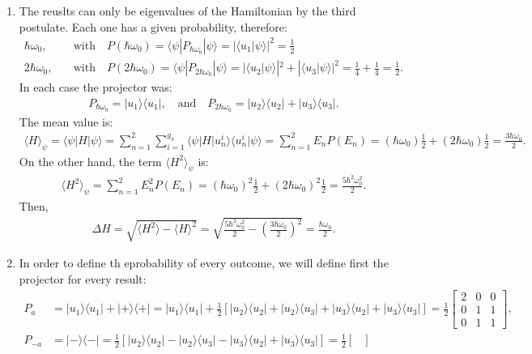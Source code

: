 \documentclass[letterpaper,11pt,twoside]{article}
\newcommand{\ket}[1]{|#1\rangle}
\newcommand{\bra}[1]{\langle#1|}
\newcommand{\braket}[1]{\langle#1\rangle}
\begin{document}
\begin{enumerate}[itemsep=0pt,topsep=0pt,label=\alph*.]
  \item The reuslts can only be eigenvalues of the Hamiltonian by the third postulate. Each one has a given probability, therefore:
  \begin{align*}
    \hbar\omega_0,&\quad\text{with}\quad P(\hbar\omega_0)=\braket{\psi|P_{\hbar\omega_0}|\psi}=|\braket{u_1|\psi}|^2=\frac{1}{2}\\
    2\hbar\omega_0,&\quad\text{with}\quad P(2\hbar\omega_0)=\braket{\psi|P_{2\hbar\omega_0}|\psi}=|\braket{u_2|\psi}|^2+|\braket{u_3|\psi}|^2=\frac{1}{4}+\frac{1}{4}=\frac{1}{2}.
  \end{align*}
  In each case the projector was:
  \begin{align*}
    P_{\hbar\omega_0}=\ket{u_1}\bra{u_1},\quad\text{and}\quad P_{2\hbar\omega_0}=\ket{u_2}\bra{u_2}+\ket{u_3}\bra{u_3}.
  \end{align*}
  The mean value is:
  \begin{align*}
    \braket{H}_\psi=\braket{\psi|H|\psi}=\sum_{n=1}^2\sum_{i=1}^{g_n}\braket{\psi|H|u_n^i}\braket{u_n^i|\psi}=\sum_{n=1}^2E_nP(E_n)=(\hbar\omega_0)\frac{1}{2}+(2\hbar\omega_0)\frac{1}{2}=\frac{3\hbar\omega_0}{2}.
  \end{align*}
  On the other hand, the term $\braket{H^2}_\psi$ is:
  \begin{align*}
    \braket{H^2}_\psi=\sum_{n=1}^2E_n^2P(E_n)=(\hbar\omega_0)^2\frac{1}{2}+(2\hbar\omega_0)^2\frac{1}{2}=\frac{5\hbar^2\omega_0^2}{2}.
  \end{align*}
  Then,
  \begin{align*}
    \Delta H=\sqrt{\braket{H^2}-\braket{H}^2}=\sqrt{\frac{5\hbar^2\omega_0^2}{2}-\left(\frac{3\hbar\omega_0}{2}\right)^2}=\frac{\hbar\omega_0}{2}.
  \end{align*}
  \item In order to define th eprobability of every outcome, we will define first the projector for every result:
  \begin{align*}
    P_a&=\ket{u_1}\bra{u_1}+\ket{+}\bra{+}=\ket{u_1}\bra{u_1}+\frac{1}{2}[\ket{u_2}\bra{u_2}+\ket{u_2}\bra{u_3}+\ket{u_3}\bra{u_2}+\ket{u_3}\bra{u_3}]=\frac{1}{2}\begin{bmatrix}
      2&0&0\\0&1&1\\0&1&1
    \end{bmatrix},\\
    P_{-a}&=\ket{-}\bra{-}=\frac{1}{2}[\ket{u_2}\bra{u_2}-\ket{u_2}\bra{u_3}-\ket{u_3}\bra{u_2}+\ket{u_3}\bra{u_3}]=\frac{1}{2}\begin{bmatrix}

\end{bmatrix}
\end{align*}
\end{enumerate}
\end{document}
